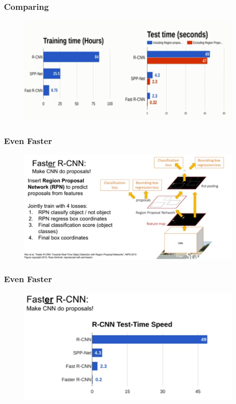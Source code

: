 \documentclass{beamer}
\begin{document}
\begin{frame}
	\frametitle{Comparing}
	
	\begin{figure}
		\includegraphics[width=\linewidth]{Pics/crcnn.PNG}
		
	\end{figure}
	
\end{frame}
\begin{frame}
\frametitle{Even Faster}
\begin{figure}
	\includegraphics[width=\linewidth]{Pics/FasterRCNN.png}
\end{figure}
\end{frame}

\begin{frame}
\frametitle{Even Faster}

\begin{figure}
	\includegraphics[width=\linewidth]{Pics/fastercompare.png}
	
\end{figure}

\end{frame}
\end{document}
